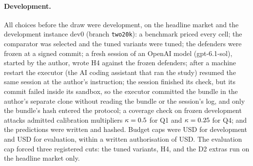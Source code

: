 \documentclass[11pt]{article}
\begin{document}
\paragraph{Development.} All choices before the draw were development, on the headline market and the development instance dev0 (branch \texttt{two20k}): a benchmark priced every cell; the comparator was selected and the tuned variants were tuned; the defenders were frozen at a signed commit; a fresh session of an OpenAI model (gpt-6.1-sol), started by the author, wrote H4 against the frozen defenders; after a machine restart the executor (the AI coding assistant that ran the study) resumed the same session at the author's instruction; the session finished its check, but its commit failed inside its sandbox, so the executor committed the bundle in the author's separate clone without reading the bundle or the session's log, and only the bundle's hash entered the protocol; a coverage check on frozen development attacks admitted calibration multipliers $\kappa = 0.5$ for Q1 and $\kappa = 0.25$ for Q4; and the predictions were written and hashed. Budget caps were  USD for development and  USD for evaluation, within a written authorisation of  USD. The evaluation cap forced three registered cuts: the tuned variants, H4, and the D2 extras run on the headline market only.
\end{document}

